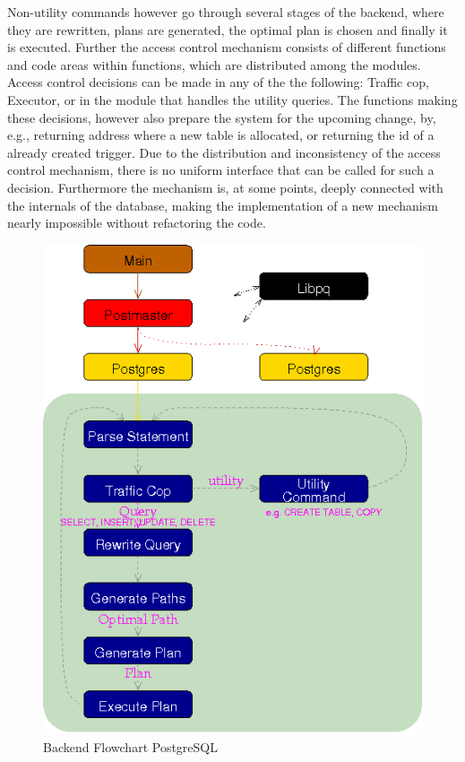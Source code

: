 Non-utility commands however go through  several stages of  the backend, where they are rewritten, plans are generated, the optimal plan is chosen and finally it is executed.
%
Further the access control mechanism consists of different functions and code areas  within functions, which are distributed among the modules.
%
Access control decisions can be made in any of the the following: Traffic cop, Executor, or in the module that handles the utility queries. 
%
The functions making these decisions, however also prepare the system for the upcoming change, by, e.g., returning address where a new table is allocated, or returning the id of a already created trigger. 
%
Due to the distribution and inconsistency  of the access control mechanism, there is no uniform interface that can be called for such a decision.
%
Furthermore  the mechanism is, at some points, deeply connected with the internals of the database, making the implementation of a new mechanism nearly impossible without refactoring the code.
%
\begin{figure}[!ht]
  \centering
    \includegraphics[width=1\textwidth]{img/backend_flowchart.png}
    \caption{Backend Flowchart PostgreSQL \protect \footnotemark}\label{figure:postgresql:architecture}
\end{figure}
%
%
\FloatBarrier
%
